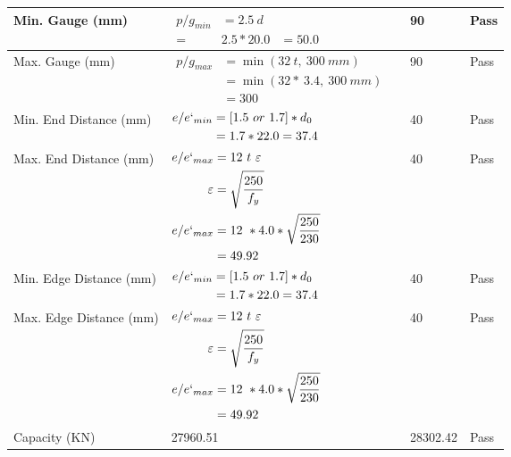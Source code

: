 \documentclass{article}%
\begin{document}
\begin{longtable}{|p{4cm}|p{5cm}|p{5.5cm}|p{1.5cm}|}
\hline%
Min. Gauge (mm)&$\begin{aligned}p/g_{min}&= 2.5 ~ d&\\ =&2.5*20.0&=50.0\end{aligned}$&90&Pass\\%
\hline%
Max. Gauge (mm)&$\begin{aligned}p/g_{max} &=\min(32~t,~300~mm)&\\ &=\min(32 *~3.4,~ 300 ~mm)\\&=300\end{aligned}$&90&Pass\\%
\hline%
Min. End Distance (mm)&$\begin{aligned}e/e`_{min} &=[1.5~or~ 1.7] * d_0\\ &=1.7*22.0=37.4 \end{aligned}$&40&Pass\\%
\hline%
Max. End Distance (mm)&$\begin{aligned}e/e`_{max} &= 12~ t~ \varepsilon&\\ \varepsilon &= \sqrt{\frac{250}{f_y}}\\ e/e`_{max}&=12 ~*4.0*\sqrt{\frac{250}{230}}\\ &=49.92\\ \end{aligned}$&40&Pass\\%
\hline%
Min. Edge Distance (mm)&$\begin{aligned}e/e`_{min} &=[1.5~or~ 1.7] * d_0\\ &=1.7*22.0=37.4 \end{aligned}$&40&Pass\\%
\hline%
Max. Edge Distance (mm)&$\begin{aligned}e/e`_{max} &= 12~ t~ \varepsilon&\\ \varepsilon &= \sqrt{\frac{250}{f_y}}\\ e/e`_{max}&=12 ~*4.0*\sqrt{\frac{250}{230}}\\ &=49.92\\ \end{aligned}$&40&Pass\\%
\hline%
Capacity (KN)&27960.51&28302.42&Pass\\%
\hline%
\end{longtable}

%
\end{document}
